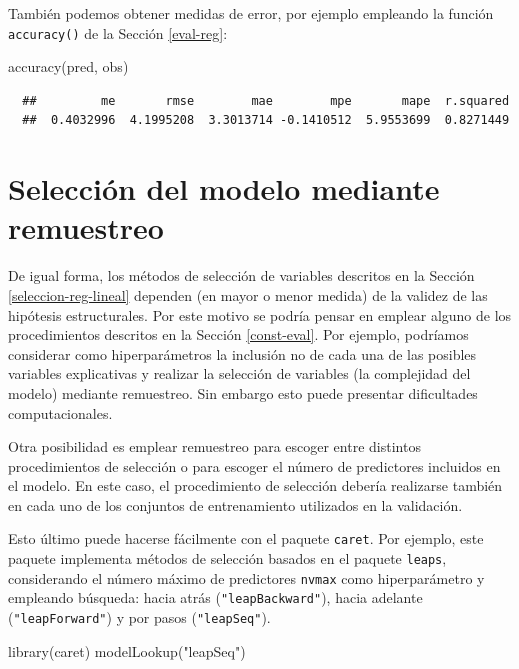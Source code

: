 \documentclass[
]{book}
\newenvironment{Shaded}{\begin{snugshade}}{\end{snugshade}}
\newcommand{\FunctionTok}[1]{\textcolor[rgb]{0.00,0.00,0.00}{#1}}
\newcommand{\NormalTok}[1]{#1}
\newcommand{\StringTok}[1]{\textcolor[rgb]{0.31,0.60,0.02}{#1}}
\theoremstyle{break}
\theoremstyle{nonumberplain}
\begin{document}
También podemos obtener medidas de error, por ejemplo empleando la función \texttt{accuracy()} de la Sección \ref{eval-reg}:

\begin{Shaded}
\begin{Highlighting}[]
\FunctionTok{accuracy}\NormalTok{(pred, obs)}
\end{Highlighting}
\end{Shaded}

\begin{verbatim}
  ##         me       rmse        mae        mpe       mape  r.squared 
  ##  0.4032996  4.1995208  3.3013714 -0.1410512  5.9553699  0.8271449
\end{verbatim}

\hypertarget{selec-ae-reg-lineal}{%
\section{Selección del modelo mediante remuestreo}\label{selec-ae-reg-lineal}}

De igual forma, los métodos de selección de variables descritos en la Sección \ref{seleccion-reg-lineal} dependen (en mayor o menor medida) de la validez de las hipótesis estructurales.
Por este motivo se podría pensar en emplear alguno de los procedimientos descritos en la Sección \ref{const-eval}.
Por ejemplo, podríamos considerar como hiperparámetros la inclusión no de cada una de las posibles variables explicativas y realizar la selección de variables (la complejidad del modelo) mediante remuestreo.
Sin embargo esto puede presentar dificultades computacionales.

Otra posibilidad es emplear remuestreo para escoger entre distintos procedimientos de selección o para escoger el número de predictores incluidos en el modelo.
En este caso, el procedimiento de selección debería realizarse también en cada uno de los conjuntos de entrenamiento utilizados en la validación.

Esto último puede hacerse fácilmente con el paquete \texttt{caret}.
Por ejemplo, este paquete implementa métodos de selección basados en el paquete \texttt{leaps}, considerando el número máximo de predictores \texttt{nvmax} como hiperparámetro y empleando búsqueda: hacia atrás (\texttt{"leapBackward"}), hacia adelante (\texttt{"leapForward"}) y por pasos (\texttt{"leapSeq"}).

\begin{Shaded}
\begin{Highlighting}[]
\FunctionTok{library}\NormalTok{(caret)}
\FunctionTok{modelLookup}\NormalTok{(}\StringTok{"leapSeq"}\NormalTok{)}
\end{Highlighting}
\end{Shaded}
\end{document}
